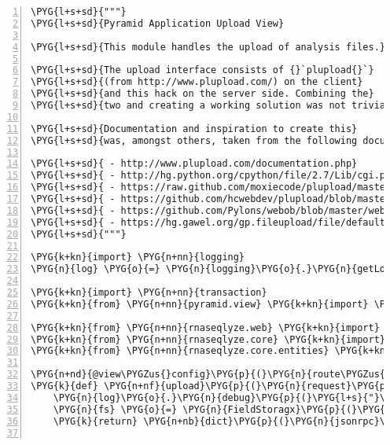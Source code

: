 \begin{Verbatim}[commandchars=\\\{\},numbers=left,firstnumber=1,stepnumber=5]
\PYG{l+s+sd}{"""}
\PYG{l+s+sd}{Pyramid Application Upload View}

\PYG{l+s+sd}{This module handles the upload of analysis files.}

\PYG{l+s+sd}{The upload interface consists of {}`plupload{}`}
\PYG{l+s+sd}{(from http://www.plupload.com/) on the client}
\PYG{l+s+sd}{and this hack on the server side. Combining the}
\PYG{l+s+sd}{two and creating a working solution was not trivial.}

\PYG{l+s+sd}{Documentation and inspiration to create this}
\PYG{l+s+sd}{was, amongst others, taken from the following documents:}

\PYG{l+s+sd}{ - http://www.plupload.com/documentation.php}
\PYG{l+s+sd}{ - http://hg.python.org/cpython/file/2.7/Lib/cgi.py\PYGZsh{}l353}
\PYG{l+s+sd}{ - https://raw.github.com/moxiecode/plupload/master/examples/upload.php}
\PYG{l+s+sd}{ - https://github.com/hcwebdev/plupload/blob/master/examples/server.py}
\PYG{l+s+sd}{ - https://github.com/Pylons/webob/blob/master/webob/request.py\PYGZsh{}L102}
\PYG{l+s+sd}{ - https://hg.gawel.org/gp.fileupload/file/default/gp/fileupload/storage.py\PYGZsh{}l97}
\PYG{l+s+sd}{"""}

\PYG{k+kn}{import} \PYG{n+nn}{logging}
\PYG{n}{log} \PYG{o}{=} \PYG{n}{logging}\PYG{o}{.}\PYG{n}{getLogger}\PYG{p}{(}\PYG{n}{\PYGZus{}\PYGZus{}name\PYGZus{}\PYGZus{}}\PYG{p}{)}

\PYG{k+kn}{import} \PYG{n+nn}{transaction}
\PYG{k+kn}{from} \PYG{n+nn}{pyramid.view} \PYG{k+kn}{import} \PYG{n}{view\PYGZus{}config}

\PYG{k+kn}{from} \PYG{n+nn}{rnaseqlyze.web} \PYG{k+kn}{import} \PYG{n}{DBSession}
\PYG{k+kn}{from} \PYG{n+nn}{rnaseqlyze.core} \PYG{k+kn}{import} \PYG{n}{service}
\PYG{k+kn}{from} \PYG{n+nn}{rnaseqlyze.core.entities} \PYG{k+kn}{import} \PYG{n}{UploadSession}

\PYG{n+nd}{@view\PYGZus{}config}\PYG{p}{(}\PYG{n}{route\PYGZus{}name}\PYG{o}{=}\PYG{l+s}{'}\PYG{l+s}{upload}\PYG{l+s}{'}\PYG{p}{,} \PYG{n}{request\PYGZus{}method}\PYG{o}{=}\PYG{l+s}{'}\PYG{l+s}{POST}\PYG{l+s}{'}\PYG{p}{,} \PYG{n}{renderer}\PYG{o}{=}\PYG{l+s}{"}\PYG{l+s}{json}\PYG{l+s}{"}\PYG{p}{)}
\PYG{k}{def} \PYG{n+nf}{upload}\PYG{p}{(}\PYG{n}{request}\PYG{p}{)}\PYG{p}{:}
    \PYG{n}{log}\PYG{o}{.}\PYG{n}{debug}\PYG{p}{(}\PYG{l+s}{"}\PYG{l+s}{upload(): content-type }\PYG{l+s}{'}\PYG{l+s+si}{\PYGZpc{}s}\PYG{l+s}{'}\PYG{l+s}{"} \PYG{o}{\PYGZpc{}} \PYG{n}{request}\PYG{o}{.}\PYG{n}{content\PYGZus{}type}\PYG{p}{)}
    \PYG{n}{fs} \PYG{o}{=} \PYG{n}{FieldStoragx}\PYG{p}{(}\PYG{n}{fp}\PYG{o}{=}\PYG{n}{request}\PYG{o}{.}\PYG{n}{environ}\PYG{p}{[}\PYG{l+s}{'}\PYG{l+s}{wsgi.input}\PYG{l+s}{'}\PYG{p}{]}\PYG{p}{,} \PYG{n}{environ}\PYG{o}{=}\PYG{n}{request}\PYG{o}{.}\PYG{n}{environ}\PYG{p}{)}
    \PYG{k}{return} \PYG{n+nb}{dict}\PYG{p}{(}\PYG{n}{jsonrpc}\PYG{o}{=}\PYG{l+s}{"}\PYG{l+s}{2.0}\PYG{l+s}{"}\PYG{p}{,} \PYG{n}{result}\PYG{o}{=}\PYG{n+nb+bp}{None}\PYG{p}{,} \PYG{n+nb}{id}\PYG{o}{=}\PYG{n+nb+bp}{None}\PYG{p}{)}


\end{Verbatim}
